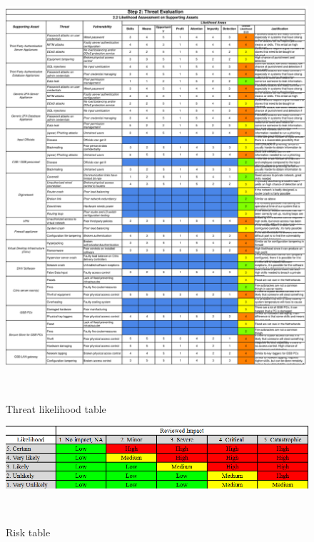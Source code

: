 \begin{figure}
    \centering
    \includegraphics[keepaspectratio,width=1\textwidth]{03-risk-analysis/003-TE/img/likelihood.pdf}
    \caption{Threat likelihood table}~\label{fig:likelihood}
\end{figure}

\begin{figure}
    \centering
    \includegraphics[keepaspectratio,width=1\textwidth]{03-risk-analysis/004-RE/img/riskTable.png}
    \caption{Risk table}~\label{fig:riskTable}
\end{figure}

